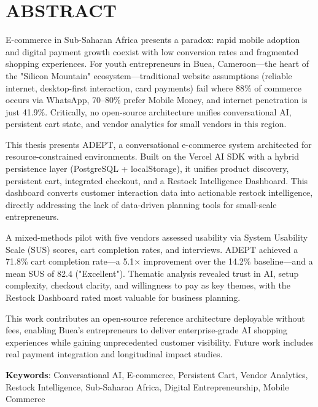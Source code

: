 \documentclass[12pt,a4paper]{article}
\begin{document}
\section*{ABSTRACT}

\noindent E-commerce in Sub-Saharan Africa presents a paradox: rapid mobile adoption and digital payment growth coexist with low conversion rates and fragmented shopping experiences. For youth entrepreneurs in Buea, Cameroon---the heart of the "Silicon Mountain" ecosystem---traditional website assumptions (reliable internet, desktop-first interaction, card payments) fail where 88\% of commerce occurs via WhatsApp, 70--80\% prefer Mobile Money, and internet penetration is just 41.9\%. Critically, no open-source architecture unifies conversational AI, persistent cart state, and vendor analytics for small vendors in this region.

This thesis presents ADEPT, a conversational e-commerce system architected for resource-constrained environments. Built on the Vercel AI SDK with a hybrid persistence layer (PostgreSQL + localStorage), it unifies product discovery, persistent cart, integrated checkout, and a Restock Intelligence Dashboard. This dashboard converts customer interaction data into actionable restock intelligence, directly addressing the lack of data-driven planning tools for small-scale entrepreneurs.

A mixed-methods pilot with five vendors assessed usability via System Usability Scale (SUS) scores, cart completion rates, and interviews. ADEPT achieved a 71.8\% cart completion rate---a 5.1× improvement over the 14.2\% baseline---and a mean SUS of 82.4 ("Excellent"). Thematic analysis revealed trust in AI, setup complexity, checkout clarity, and willingness to pay as key themes, with the Restock Dashboard rated most valuable for business planning.

This work contributes an open-source reference architecture deployable without fees, enabling Buea's entrepreneurs to deliver enterprise-grade AI shopping experiences while gaining unprecedented customer visibility. Future work includes real payment integration and longitudinal impact studies.

\vspace{1cm}

\textbf{Keywords}: Conversational AI, E-commerce, Persistent Cart, Vendor Analytics, Restock Intelligence, Sub-Saharan Africa, Digital Entrepreneurship, Mobile Commerce

\newpage
\end{document}
